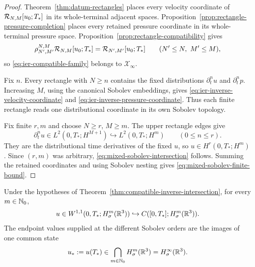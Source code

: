 \begin{proof}
Theorem~\ref{thm:datum-rectangles} places every velocity coordinate of
\(\mathcal R_{N,M}[u_0;T_*]\) in its whole-terminal adjacent spaces.
Proposition~\ref{prop:rectangle-pressure-completion} places every retained
pressure coordinate in its whole-terminal pressure space.
Proposition~\ref{prop:rectangle-compatibility} gives
\[
 \rho_{N',M'}^{N,M}\mathcal R_{N,M}[u_0;T_*]
 =\mathcal R_{N',M'}[u_0;T_*]
 \qquad(N'\le N,\ M'\le M),
\]
so \eqref{eq:ier-compatible-family} belongs to \(\mathscr X_\infty\).

Fix \(n\).  Every rectangle with \(N\ge n\) contains the fixed distributions
\(\partial_t^nu\) and \(\partial_t^np\).  Increasing \(M\), using the
canonical Sobolev embeddings, gives
\eqref{eq:ier-inverse-velocity-coordinate} and
\eqref{eq:ier-inverse-pressure-coordinate}.  Thus each finite rectangle reads
one distributional coordinate in its own Sobolev topology.

Fix finite \(r,m\) and choose \(N\ge r\), \(M\ge m\).  The upper rectangle
edges give
\[
 \partial_t^nu\in L^2(0,T_*;H^{M+1})
 \hookrightarrow L^2(0,T_*;H^m)
 \qquad(0\le n\le r).
\]
They are the distributional time derivatives of the fixed \(u\), so
\(u\in H^r(0,T_*;H^m)\).  Since \((r,m)\) was arbitrary,
\eqref{eq:mixed-sobolev-intersection} follows.  Summing the retained
coordinates and using Sobolev nesting gives
\eqref{eq:mixed-sobolev-finite-bound}.
\end{proof}

\begin{proposition}
\label{prop:ier-complete-spatial-endpoint}
Under the hypotheses of
Theorem~\ref{thm:compatible-inverse-intersection}, for every
\(m\in\mathbb N_0\),
\begin{equation}
 u\in W^{1,1}(0,T_*;H^m_\sigma(\mathbb R^3))
 \hookrightarrow C([0,T_*];H^m_\sigma(\mathbb R^3)).
 \label{eq:ier-spatial-row-W11}
\end{equation}
The endpoint values supplied at the different Sobolev orders are the images
of one common state
\begin{equation}
 u_*:=u(T_*)\in\bigcap_{m\in\mathbb N_0}H^m_\sigma(\mathbb R^3)
 =H^\infty_\sigma(\mathbb R^3).
 \label{eq:ier-common-spatial-endpoint}
\end{equation}
\end{proposition}

